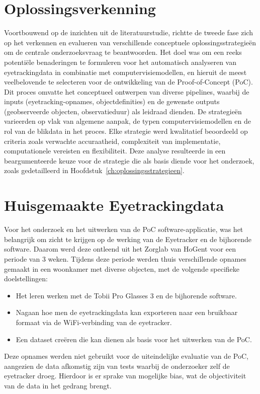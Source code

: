 \section{Oplossingsverkenning}

Voortbouwend op de inzichten uit de literatuurstudie, richtte de tweede fase zich op het verkennen en evalueren van verschillende 
conceptuele oplossingsstrategieën om de centrale onderzoeksvraag te beantwoorden. 
Het doel was om een reeks potentiële benaderingen te formuleren voor het automatisch analyseren 
van eyetrackingdata in combinatie met computervisiemodellen, en hieruit de meest veelbelovende te 
selecteren voor de ontwikkeling van de Proof-of-Concept (PoC). 
Dit proces omvatte het conceptueel ontwerpen van diverse pipelines, waarbij de inputs (eyetracking-opnames, objectdefinities) 
en de gewenste outputs (geobserveerde objecten, observatieduur) als leidraad dienden. 
De strategieën varieerden op vlak van algemene aanpak, de typen computervisiemodellen 
en de rol van de blikdata in het proces. 
Elke strategie werd kwalitatief beoordeeld op criteria zoals verwachte accuraatheid, complexiteit van implementatie, 
computationele vereisten en flexibiliteit. 
Deze analyse resulteerde in een beargumenteerde keuze voor de strategie die als basis diende voor het onderzoek, 
zoals gedetailleerd in Hoofdstuk~\ref{ch:oplossingsstrategieen}.

\section{Huisgemaakte Eyetrackingdata}

Voor het onderzoek en het uitwerken van de PoC software-applicatie, was het belangrijk om zicht te krijgen op de werking van de Eyetracker en de bijhorende software.
Daarom werd deze ontleend uit het Zorglab van HoGent voor een periode van 3 weken. 
Tijdens deze periode werden thuis verschillende opnames gemaakt in een woonkamer met diverse objecten, met de volgende specifieke doelstellingen:
\begin{itemize}
    \item Het leren werken met de Tobii Pro Glasses 3 en de bijhorende software.
    \item Nagaan hoe men de eyetrackingdata kan exporteren naar een bruikbaar formaat via de WiFi-verbinding van de eyetracker.
    \item Een dataset creëren die kan dienen als basis voor het uitwerken van de PoC.
\end{itemize}
Deze opnames werden niet gebruikt voor de uiteindelijke evaluatie van de PoC, aangezien de data afkomstig zijn van tests waarbij de onderzoeker zelf de eyetracker droeg.
Hierdoor is er sprake van mogelijke bias, wat de objectiviteit van de data in het gedrang brengt.

